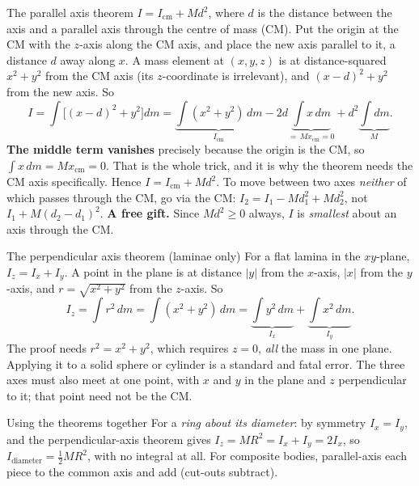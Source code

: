 \begin{derivbox}{The parallel axis theorem}
$I=I_{\text{cm}}+Md^2$, where $d$ is the distance between the axis and a parallel axis through the centre of mass (CM).
 Put the origin at the CM with the $z$-axis along the CM axis, and place the new axis parallel to it, a distance $d$ away along $x$. A mass element at $(x,y,z)$ is at distance-squared $x^2+y^2$
from the CM axis (its $z$-coordinate is irrelevant), and $(x-d)^2+y^2$ from the new axis. So
\[
I=\int\!\big[(x-d)^2+y^2\big]dm=\underbrace{\int(x^2+y^2)\,dm}_{I_{\text{cm}}}
-2d\underbrace{\int x\,dm}_{=\,Mx_{\text{cm}}=0}+d^2\underbrace{\int dm}_{M}.
\]
 \textbf{The middle term vanishes} precisely because the origin is the CM, so
$\int x\,dm=Mx_{\text{cm}}=0$. That is the whole trick, and it is why the theorem needs the CM axis
specifically. Hence $I=I_{\text{cm}}+Md^2$. To move between two axes \emph{neither} of which passes
through the CM, go via the CM: $I_2=I_1-Md_1^2+Md_2^2$, not $I_1+M(d_2-d_1)^2$.
 \textbf{A free gift.} Since $Md^2\ge0$ always, $I$ is \emph{smallest} about an axis through the
CM.
\end{derivbox}

\begin{derivbox}{The perpendicular axis theorem (laminae only)}
For a flat lamina in the $xy$-plane, $I_z=I_x+I_y$. A point in the plane is at distance $|y|$ from the
$x$-axis, $|x|$ from the $y$-axis, and $r=\sqrt{x^2+y^2}$ from the $z$-axis. So
\[
I_z=\int r^2\,dm=\int(x^2+y^2)\,dm=\underbrace{\int y^2\,dm}_{I_x}+\underbrace{\int x^2\,dm}_{I_y}.
\]
The proof needs $r^2=x^2+y^2$, which requires $z=0$, \emph{all} the mass in one plane. Applying it to
a solid sphere or cylinder is a standard and fatal error. The three axes must also meet at one point,
with $x$ and $y$ in the plane and $z$ perpendicular to it; that point need not be the CM.
\end{derivbox}

\begin{figure}[htbp]
\centering
{}
\end{figure}

\begin{methodbox}{Using the theorems together}
For a \emph{ring about its diameter}: by symmetry $I_x=I_y$, and the perpendicular-axis theorem gives
$I_z=MR^2=I_x+I_y=2I_x$, so $I_{\text{diameter}}=\tfrac{1}{2} MR^2$, with no integral at all. For
composite bodies, parallel-axis each piece to the common axis and add (cut-outs subtract).
\end{methodbox}

